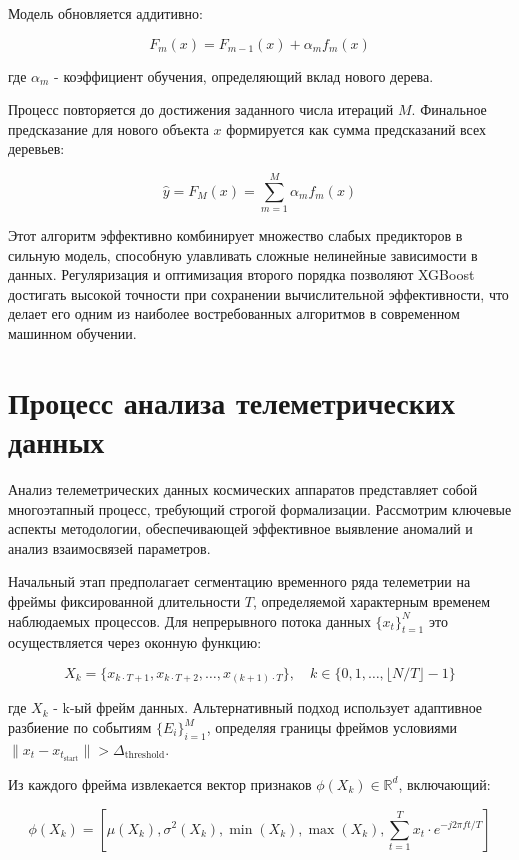 Модель обновляется аддитивно:

\[F_m(x) = F_{m-1}(x) + \alpha_m f_m(x)\]

где $\alpha_m$ - коэффициент обучения, определяющий вклад нового дерева.

Процесс повторяется до достижения заданного числа итераций $M$. Финальное
предсказание для нового объекта $x$ формируется как сумма предсказаний всех
деревьев:

\[\hat{y} = F_M(x) = \sum_{m=1}^M \alpha_m f_m(x)\]

Этот алгоритм эффективно комбинирует множество слабых предикторов в сильную
модель, способную улавливать сложные нелинейные зависимости в данных.
Регуляризация и оптимизация второго порядка позволяют XGBoost достигать высокой
точности при сохранении вычислительной эффективности, что делает его одним из
наиболее востребованных алгоритмов в современном машинном обучении.

\section{Процесс анализа телеметрических данных}

Анализ телеметрических данных космических аппаратов представляет собой
многоэтапный процесс, требующий строгой формализации. Рассмотрим ключевые
аспекты методологии, обеспечивающей эффективное выявление аномалий и анализ
взаимосвязей параметров.

Начальный этап предполагает сегментацию временного ряда телеметрии на фреймы
фиксированной длительности $T$, определяемой характерным временем наблюдаемых
процессов. Для непрерывного потока данных $\{x_t\}_{t=1}^N$ это осуществляется
через оконную функцию:

\[
	X_k = \{x_{k \cdot T + 1}, x_{k \cdot T + 2}, \ldots, x_{(k+1) \cdot T}\}, \quad k \in \{0, 1, \ldots, \lfloor N/T \rfloor - 1\}
\]

где $X_k$ - k-ый фрейм данных. Альтернативный подход использует адаптивное
разбиение по событиям $\{E_i\}_{i=1}^M$, определяя границы фреймов условиями
$\|x_t - x_{t_{\text{start}}}\| > \Delta_{\text{threshold}}$.

Из каждого фрейма извлекается вектор признаков $\phi(X_k) \in \mathbb{R}^d$, включающий:

\[
	\phi(X_k) = \left[\mu(X_k), \sigma^2(X_k), \min(X_k), \max(X_k), \sum_{t=1}^T x_t \cdot e^{-j2\pi ft/T}\right]
\]

